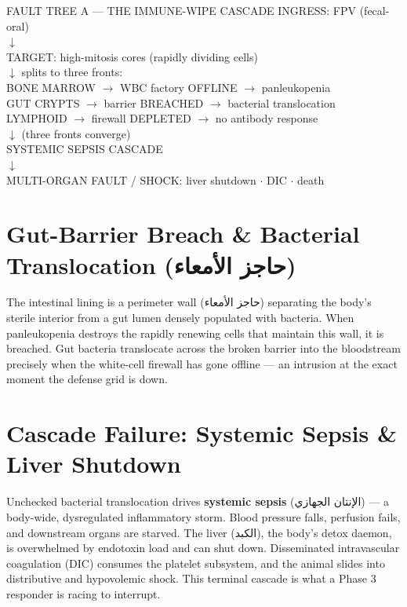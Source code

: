 \documentclass[12pt,oneside]{book}
\newcommand{\ar}[1]{\textarabic{#1}}
\begin{document}
\begin{kumbox}{FAULT TREE A --- THE IMMUNE-WIPE CASCADE}
\ttfamily\small
INGRESS: FPV (fecal-oral)\\
\quad $\downarrow$\\
TARGET: high-mitosis cores (rapidly dividing cells)\\
\quad $\downarrow$ \quad splits to three fronts:\\
\quad [1] BONE MARROW  $\rightarrow$ WBC factory OFFLINE $\rightarrow$ panleukopenia\\
\quad [2] GUT CRYPTS   $\rightarrow$ barrier BREACHED   $\rightarrow$ bacterial translocation\\
\quad [3] LYMPHOID     $\rightarrow$ firewall DEPLETED   $\rightarrow$ no antibody response\\
\quad $\downarrow$ \quad (three fronts converge)\\
SYSTEMIC SEPSIS CASCADE\\
\quad $\downarrow$\\
MULTI-ORGAN FAULT / SHOCK: liver shutdown $\cdot$ DIC $\cdot$ death
\end{kumbox}

\section{Gut-Barrier Breach \& Bacterial Translocation \texorpdfstring{(\ar{حاجز الأمعاء})}{}}
The intestinal lining is a perimeter wall (\ar{حاجز الأمعاء}) separating
the body's sterile interior from a gut lumen densely populated with
bacteria. When panleukopenia destroys the rapidly renewing cells that
maintain this wall, it is breached. Gut bacteria translocate across the
broken barrier into the bloodstream precisely when the white-cell
firewall has gone offline --- an intrusion at the exact moment the defense
grid is down.

\section{Cascade Failure: Systemic Sepsis \& Liver Shutdown}
Unchecked bacterial translocation drives \textbf{systemic sepsis}
(\ar{الإنتان الجهازي}) --- a body-wide, dysregulated inflammatory storm.
Blood pressure falls, perfusion fails, and downstream organs are starved.
The liver (\ar{الكبد}), the body's detox daemon, is overwhelmed by
endotoxin load and can shut down. Disseminated intravascular coagulation
(DIC) consumes the platelet subsystem, and the animal slides into
distributive and hypovolemic shock. This terminal cascade is what a
Phase 3 responder is racing to interrupt.
\end{document}
